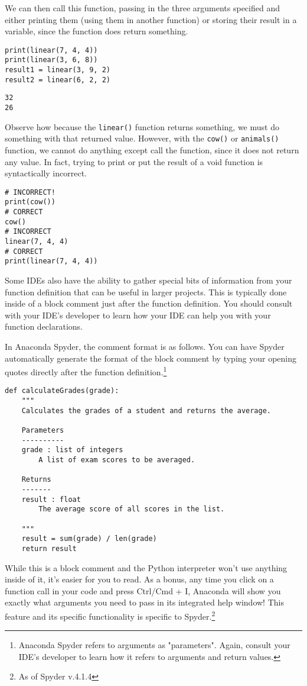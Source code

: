We can then call this function, passing in the three arguments specified and either printing them (using them in another function) or storing their result in a variable, since the function does return something.
\begin{lstlisting}[style=pippython]
print(linear(7, 4, 4))
print(linear(3, 6, 8))
result1 = linear(3, 9, 2)
result2 = linear(6, 2, 2)
\end{lstlisting}
\begin{lstlisting}
32
26
\end{lstlisting}
Observe how because the \verb|linear()| function returns something, we must do something with that returned value. However, with the \verb|cow()| or \verb|animals()| function, we cannot do anything except call the function, since it does not return any value. In fact, trying to print or put the result of a void function is syntactically incorrect.\par
\begin{lstlisting}[style=pippython]
# INCORRECT!
print(cow())
# CORRECT
cow()
# INCORRECT
linear(7, 4, 4)
# CORRECT
print(linear(7, 4, 4))
\end{lstlisting}
Some IDEs also have the ability to gather special bits of information from your function definition that can be useful in larger projects. This is typically done inside of a block comment just after the function definition. You should consult with your IDE's developer to learn how your IDE can help you with your function declarations.\par
In Anaconda Spyder, the comment format is as follows. You can have Spyder automatically generate the format of the block comment by typing your opening quotes directly after the function definition.\footnote{Anaconda Spyder refers to arguments as "parameters". Again, consult your IDE's developer to learn how it refers to arguments and return values.}\par
\begin{lstlisting}[style=pippython]
def calculateGrades(grade):
    """
    Calculates the grades of a student and returns the average.

    Parameters
    ----------
    grade : list of integers
        A list of exam scores to be averaged.

    Returns
    -------
    result : float
        The average score of all scores in the list.

    """
    result = sum(grade) / len(grade)
    return result
\end{lstlisting}
While this is a block comment and the Python interpreter won't use anything inside of it, it's easier for you to read. As a bonus, any time you click on a function call in your code and press Ctrl/Cmd + I, Anaconda will show you exactly what arguments you need to pass in its integrated help window! This feature and its specific functionality is specific to Spyder.\footnote{As of Spyder v.4.1.4}\par
